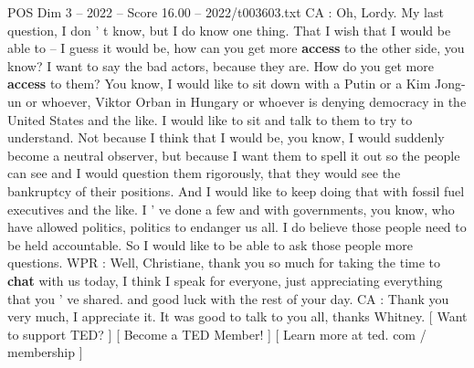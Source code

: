 \begin{textsample}{POS Dim 3 – 2022 – Score 16.00 – 2022/t003603.txt}
CA : Oh, Lordy.
My last question, I don ' t know, but I do know one thing.
That I wish that I would be able to -- I guess it would be, how can you get more \textbf{access} to the other side, you know?
I want to say the bad actors, because they are.
How do you get more \textbf{access} to them?
You know, I would like to sit down with a Putin or a Kim Jong-un or whoever, Viktor Orban in Hungary or whoever is denying democracy in the United States and the like.
I would like to sit and talk to them to try to understand.
Not because I think that I would be, you know, I would suddenly become a neutral observer, but because I want them to spell it out so the people can see and I would question them rigorously, that they would see the bankruptcy of their positions.
And I would like to keep doing that with fossil fuel executives and the like.
I ' ve done a few and with governments, you know, who have allowed politics, politics to endanger us all.
I do believe those people need to be held accountable.
So I would like to be able to ask those people more questions.
WPR : Well, Christiane, thank you so much for taking the time to \textbf{chat} with us today, I think I speak for everyone, just appreciating everything that you ' ve shared. and good luck with the rest of your day.
CA : Thank you very much, I appreciate it.
It was good to talk to you all, thanks Whitney. [ Want to support TED? ] [ Become a TED Member! ] [ Learn more at ted. com / membership ]

\end{textsample}
